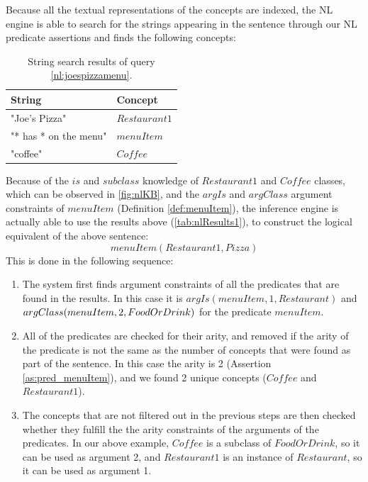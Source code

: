 Because all the textual representations of the concepts are indexed, the NL
engine is able to search for the strings appearing in the sentence through
our NL predicate assertions and finds the following concepts:
\begin{table}[H]
\centering
\caption{String search results of query \ref{nl:joespizzamenu}.}
\label{tab:nlResults1}
\begin{tabular}{|l|l|}
	\hline
	\textbf{String} & \textbf{Concept} \\
    \hline
    "Joe's Pizza" & $Restaurant1$ \\
    \hline
    "* has * on the menu" & $menuItem$ \\
    \hline
    "coffee" & $Coffee$ \\
    \hline
\end{tabular}
\end{table}

Because of the $is$ and $subclass$ knowledge of $Restaurant1$ and $Coffee$ 
classes, which can be observed in \autoref{fig:nlKB}, and the $argIs$ and 
$argClass$ argument constraints of $menuItem$ (Definition \ref{def:menuItem}), 
the inference engine is actually able to use the results above 
(\autoref{tab:nlResults1}), to construct the logical equivalent of the above 
sentence: 
\begin{equation*}
menuItem(Restaurant1, Pizza)
\end{equation*}
This is done in the following sequence:
\begin{enumerate}
\item The system first finds argument constraints of all the predicates that are
found in the results. In this case it is $argIs(menuItem,1,Restaurant)$ and
$argClass(menuItem,\\
2,FoodOrDrink)$ for the predicate $menuItem$.
\item All of the predicates are checked for their arity, and removed if the
arity of the predicate is not the same as the number of concepts that were found
as part of the sentence. In this case the arity is 2 (Assertion 
\ref{as:pred_menuItem}), and we found 2 unique concepts ($Coffee$ and 
$Restaurant1$).
\item The concepts that are not filtered out in the previous steps are then 
checked whether they fulfill the the arity constraints of the arguments of the
predicates. In our above example, $Coffee$ is a subclass of $FoodOrDrink$, so
it can be used as argument 2, and $Restaurant1$ is an instance of $Restaurant$,
so it can be used as argument 1.
\end{enumerate}

